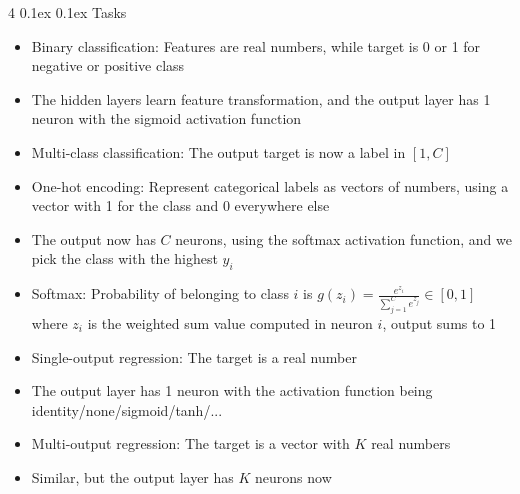\documentclass[10pt, landscape]{article}
\makeatletter
\renewcommand{\subsection}{\@startsection{subsection}{2}{0mm}%
  {0.1ex} %
  {0.1ex} %
  {\normalfont\normalsize\bfseries}}
\makeatother
\begin{document}
\begin{multicols*}{4}
\subsection{Tasks}
\begin{itemize}
    \item Binary classification: Features are real numbers, while target is 0 or 1 for negative or positive class
    \item The hidden layers learn feature transformation, and the output layer has 1 neuron with the sigmoid activation function
    \item Multi-class classification: The output target is now a label in $[1,C]$
    \item One-hot encoding: Represent categorical labels as vectors of numbers, using a vector with 1 for the class and 0 everywhere else
    \item The output now has $C$ neurons, using the softmax activation function,  and we pick the class with the highest $\hat{y}_i$
    \item Softmax: Probability of belonging to class $i$ is $g(z_i)=\frac{e^{z_i}}{\sum_{j=1}^Ce^{z_j}}\in [0,1]$ where $z_i$ is the weighted sum value computed in neuron $i$, output sums to 1
    \item Single-output regression: The target is a real number
    \item The output layer has 1 neuron with the activation function being identity/none/sigmoid/tanh/...
    \item Multi-output regression: The target is a vector with $K$ real numbers
    \item Similar, but the output layer has $K$ neurons now
\end{itemize}


\end{multicols*}
\end{document}
